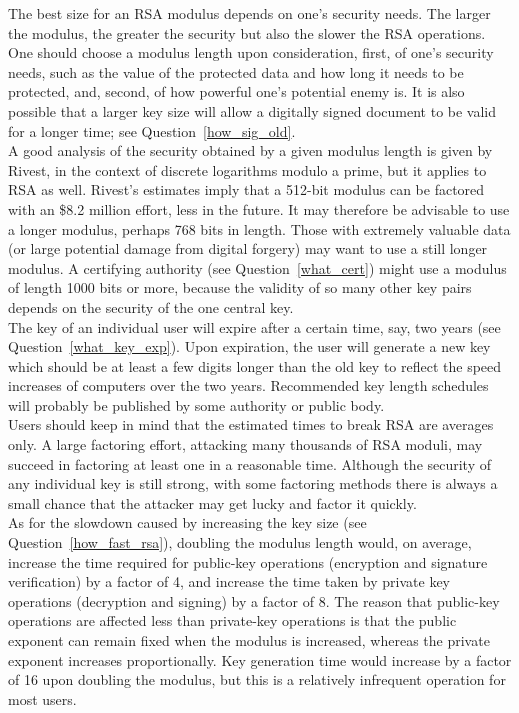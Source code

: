 The best size for an RSA modulus depends on one's security needs. The
larger the modulus, the greater the security but also the slower the
RSA operations. One should choose a modulus length upon consideration,
first, of one's security needs, such as the value of the protected data
and how long it needs to be protected, and, second, of how powerful
one's potential enemy is. It is also possible that a larger key size
will allow a digitally signed document to be valid for a longer time;
see Question~\ref{how_sig_old}.\\

A good analysis of the security obtained by a given modulus length is given
by Rivest, in the context of discrete logarithms modulo a prime, but it
applies to RSA as well. Rivest's estimates imply that a 512-bit modulus can
be factored with an \$8.2 million effort, less in the future. It may
therefore be advisable to use a longer modulus, perhaps 768 bits in length.
Those with extremely valuable data (or large potential damage from digital
forgery) may want to use a still longer modulus. A certifying authority
(see Question~\ref{what_cert}) might use a modulus of length 1000 bits or
more, because the validity of so many other key pairs depends on the
security of the one central key.\\

The key of an individual user will expire after a certain time, say, two
years (see Question~\ref{what_key_exp}). Upon expiration, the user will
generate a new key which should be at least a few digits longer than the
old key to reflect the speed increases of computers over the two years.
Recommended key length schedules will probably be published by some
authority or public body.\\

Users should keep in mind that the estimated times to break RSA are
averages only. A large factoring effort, attacking many thousands of
RSA moduli, may succeed in factoring at least one in a reasonable time.
Although the security of any individual key is still strong, with some
factoring methods there is always a small chance that the attacker may
get lucky and factor it quickly.\\

As for the slowdown caused by increasing the key size (see
Question~\ref{how_fast_rsa}), doubling the modulus length would, on
average, increase the time required for public-key operations (encryption
and signature verification) by a factor of 4, and increase the time taken
by private key operations (decryption and signing) by a factor of 8. The
reason that public-key operations are affected less than private-key
operations is that the public exponent can remain fixed when the modulus is
increased, whereas the private exponent increases proportionally. Key
generation time would increase by a factor of 16 upon doubling the modulus,
but this is a relatively infrequent operation for most users.

